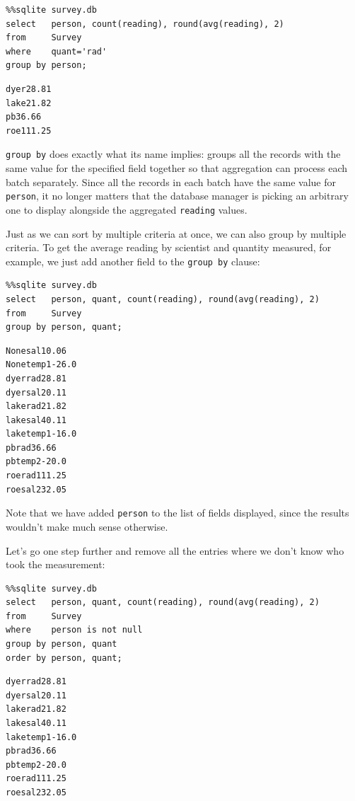 \documentclass{book}
\begin{document}
\begin{verbatim}
%%sqlite survey.db
select   person, count(reading), round(avg(reading), 2)
from     Survey
where    quant='rad'
group by person;
\end{verbatim}

\begin{verbatim}
dyer28.81
lake21.82
pb36.66
roe111.25
\end{verbatim}

\texttt{group by} does exactly what its name implies: groups all the
records with the same value for the specified field together so that
aggregation can process each batch separately. Since all the records in
each batch have the same value for \texttt{person}, it no longer matters
that the database manager is picking an arbitrary one to display
alongside the aggregated \texttt{reading} values.

Just as we can sort by multiple criteria at once, we can also group by
multiple criteria. To get the average reading by scientist and quantity
measured, for example, we just add another field to the
\texttt{group by} clause:

\begin{verbatim}
%%sqlite survey.db
select   person, quant, count(reading), round(avg(reading), 2)
from     Survey
group by person, quant;
\end{verbatim}

\begin{verbatim}
Nonesal10.06
Nonetemp1-26.0
dyerrad28.81
dyersal20.11
lakerad21.82
lakesal40.11
laketemp1-16.0
pbrad36.66
pbtemp2-20.0
roerad111.25
roesal232.05
\end{verbatim}

Note that we have added \texttt{person} to the list of fields displayed,
since the results wouldn't make much sense otherwise.

Let's go one step further and remove all the entries where we don't know
who took the measurement:

\begin{verbatim}
%%sqlite survey.db
select   person, quant, count(reading), round(avg(reading), 2)
from     Survey
where    person is not null
group by person, quant
order by person, quant;
\end{verbatim}

\begin{verbatim}
dyerrad28.81
dyersal20.11
lakerad21.82
lakesal40.11
laketemp1-16.0
pbrad36.66
pbtemp2-20.0
roerad111.25
roesal232.05
\end{verbatim}
\end{document}
